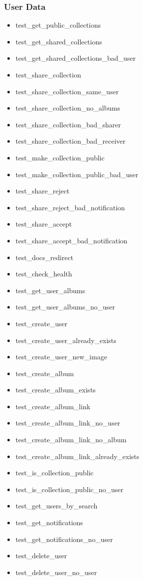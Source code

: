 \subsubsection{User Data}
\begin{multicols}{2}
    \begin{itemize}
        \item test\_get\_public\_collections
        \item test\_get\_shared\_collections
        \item test\_get\_shared\_collections\_bad\_user
        \item test\_share\_collection
        \item test\_share\_collection\_same\_user
        \item test\_share\_collection\_no\_albums
        \item test\_share\_collection\_bad\_sharer
        \item test\_share\_collection\_bad\_receiver
        \item test\_make\_collection\_public
        \item test\_make\_collection\_public\_bad\_user
        \item test\_share\_reject
        \item test\_share\_reject\_bad\_notification
        \item test\_share\_accept
        \item test\_share\_accept\_bad\_notification
        \item test\_docs\_redirect
        \item test\_check\_health
        \item test\_get\_user\_albums
        \item test\_get\_user\_albums\_no\_user
        \item test\_create\_user
        \item test\_create\_user\_already\_exists
        \item test\_create\_user\_new\_image
        \item test\_create\_album
        \item test\_create\_album\_exists
        \item test\_create\_album\_link
        \item test\_create\_album\_link\_no\_user
        \item test\_create\_album\_link\_no\_album
        \item test\_create\_album\_link\_already\_exists
        \item test\_is\_collection\_public
        \item test\_is\_collection\_public\_no\_user
        \item test\_get\_users\_by\_search
        \item test\_get\_notifications
        \item test\_get\_notifications\_no\_user
        \item test\_delete\_user
        \item test\_delete\_user\_no\_user
    \end{itemize}
\end{multicols}
